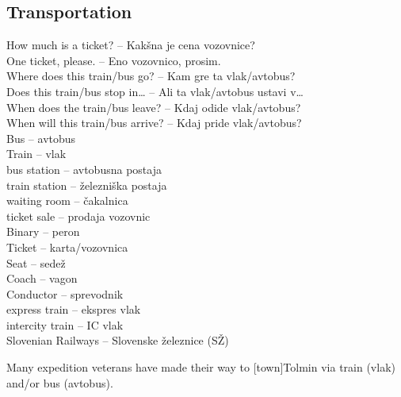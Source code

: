 \subsection{Transportation}

How much is a ticket? -- Kakšna je cena vozovnice?\\
One ticket, please. -- Eno vozovnico, prosim.\\
Where does this train/bus go? -- Kam gre ta vlak/avtobus?\\
Does this train/bus stop in\ldots{} -- Ali ta vlak/avtobus ustavi v\ldots{}\\
When does the train/bus leave? -- Kdaj odide vlak/avtobus?\\
When will this train/bus arrive? -- Kdaj pride vlak/avtobus?\\
Bus -- avtobus\\ 
Train -- vlak\\
bus station -- avtobusna postaja\\
train station -- železniška postaja\\
waiting room -- čakalnica\\
ticket sale -- prodaja vozovnic\\
Binary -- peron\\
Ticket -- karta/vozovnica\\
Seat -- sedež\\
Coach -- vagon\\
Conductor -- sprevodnik\\
express train -- ekspres vlak\\
intercity train -- IC vlak\\
Slovenian Railways -- Slovenske železnice (SŽ)\\

\begin{marginfigure}
\checkoddpage \ifoddpage \forcerectofloat \else \forceversofloat \fi
\centering
 \caption{Many expedition veterans have made their way to [town]Tolmin via train (vlak) and/or bus (avtobus). }
 \label{Thara train}
\end{marginfigure}



